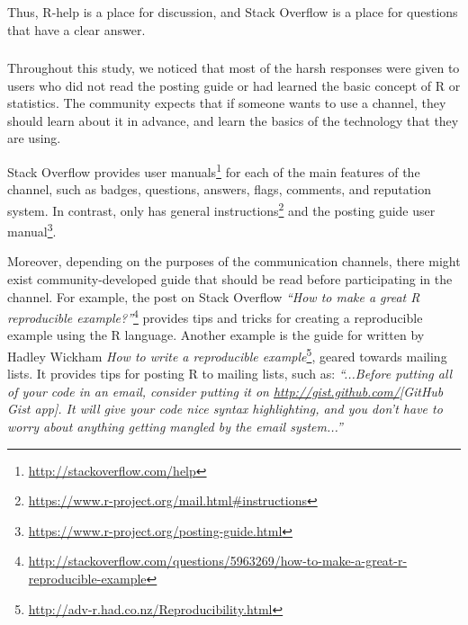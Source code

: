 
Thus, R-help is a place for discussion, and Stack Overflow is a place for questions that have a clear answer.


\subsubsection{\recb}

    Throughout this study, we noticed that most of the harsh responses were given to users who did not read the posting guide or had learned the basic concept of
    R or statistics.
    The community expects that if someone wants to use a channel, they should learn about it in advance, and learn the basics of the technology that they are using.


    Stack Overflow provides user manuals\footnote{\url{http://stackoverflow.com/help}} for each of the main features of the channel, such as badges, questions,
    answers, flags, comments, and reputation system.     In contrast, \RH only has general instructions\footnote{\url{https://www.r-project.org/mail.html\#instructions}} and the posting guide user manual\footnote{\url{https://www.r-project.org/posting-guide.html}}.

    Moreover, depending on the purposes of the communication channels, there might exist community-developed guide that should be read before participating in the channel.
    For example, the post on Stack Overflow \textit{``How to make a great R reproducible example?''}\footnote{\url{http://stackoverflow.com/questions/5963269/how-to-make-a-great-r-reproducible-example}} provides tips and tricks for creating a reproducible example using the R language.
    Another example is the guide for \RH written by Hadley Wickham \emph{How to write a reproducible
      example}\footnote{\url{http://adv-r.had.co.nz/Reproducibility.html}}, geared towards mailing lists. 
    It provides tips for posting R to mailing lists, such as: \textit{``...Before putting all of your code in an email, consider putting it on \url{http://gist.github.com/}{[GitHub Gist app]}. It will give your code nice syntax highlighting, and you don't have to worry about anything getting mangled by the email system...''}

